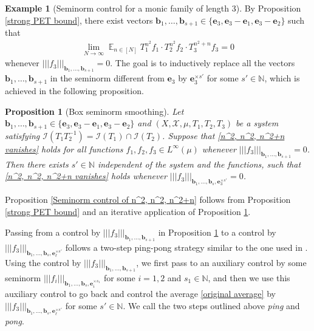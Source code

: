 \documentclass[11pt]{amsart}
\newtheorem{proposition}[lemma]{Proposition}
\theoremstyle{definition}
\newtheorem{example}{Example}
\newcommand{\N}{{\mathbb N}}
\newcommand{\CI}{{\mathcal I}}
\newcommand{\CX}{{\mathcal X}}
\newcommand{\be}{{\mathbf{e}}}
\renewcommand{\b}{{\textbf{b}}}
\newcommand{\nnorm}[1]{\lvert\!|\!| #1|\!|\!\rvert}
\DeclareMathOperator*{\E}{\mathbb{E}}
\begin{document}
\begin{example}[Seminorm control for a monic family of length 3]
By Proposition \ref{strong PET bound}, there exist vectors $\b_1, \ldots, \b_{s+1}\in\{\be_3, \be_3 - \be_1, \be_3 - \be_2\}$ such that
\begin{align}\label{n^2, n^2, n^2+n vanishes}
    \lim_{N\to\infty} \E_{n\in[N]}T_1^{n^2} f_1 \cdot T_2^{n^2}f_2 \cdot T_3^{n^2+n}f_3 = 0
\end{align}
whenever $\nnorm{f_3}_{\b_1, \ldots, \b_{s+1}} = 0$. The goal is to inductively replace all the vectors $\b_1, \ldots, \b_{s+1}$ in the seminorm different from $\be_3$ by $\be_3^{\times s'}$ for some $s'\in\N$, which is achieved in the following proposition.
\begin{proposition}[Box seminorm smoothing]\label{Smoothing of n^2, n^2, n^2+n}
    Let $\b_1, \ldots, \b_{s+1}\in\{\be_3, \be_3 - \be_1, \be_3 - \be_2\}$   and $(X, \CX, \mu, T_1, T_2, T_3)$ be a system satisfying $\CI(T_1 T_2^{-1})=\CI(T_1)\cap\CI(T_2)$. Suppose that \eqref{n^2, n^2, n^2+n vanishes} holds for all  functions $f_1, f_2, f_3\in L^\infty(\mu)$ whenever $\nnorm{f_3}_{\b_1, \ldots, \b_{s+1}} = 0$. Then  there exists $s'\in\N$ independent of the system and the functions, such that \eqref{n^2, n^2, n^2+n vanishes} holds whenever $\nnorm{f_3}_{\b_1, \ldots, \b_s, \be_3^{\times s'}}=0$.
\end{proposition}
Proposition \ref{Seminorm control of n^2, n^2, n^2+n} follows from Proposition \ref{strong PET bound} and an iterative application of Proposition \ref{Smoothing of n^2, n^2, n^2+n}.


Passing from a control by $\nnorm{f_3}_{\b_1, \ldots, \b_{s+1}}$ in Proposition \ref{Smoothing of n^2, n^2, n^2+n} to a control by $\nnorm{f_3}_{\b_1, \ldots, \b_s, \be_\ell^{\times s'}}$ follows a two-step ping-pong strategy similar to the one used in \cite{FrKu22}. Using the control by $\nnorm{f_3}_{\b_1, \ldots, \b_{s+1}}$, we first pass to an auxiliary control by some seminorm $\nnorm{f_i}_{\b_1, \ldots, \b_s, \be_i^{\times s_1}}$ for some $i=1,2$ and $s_1\in\N$, and then we use this auxiliary control to go back and control the average \eqref{original average} by $\nnorm{f_3}_{\b_1, \ldots, \b_s, \be_\ell^{\times s'}}$ for some $s'\in\N$. We call the two steps outlined above \emph{ping} and \emph{pong}.



\end{example}
\end{document}
